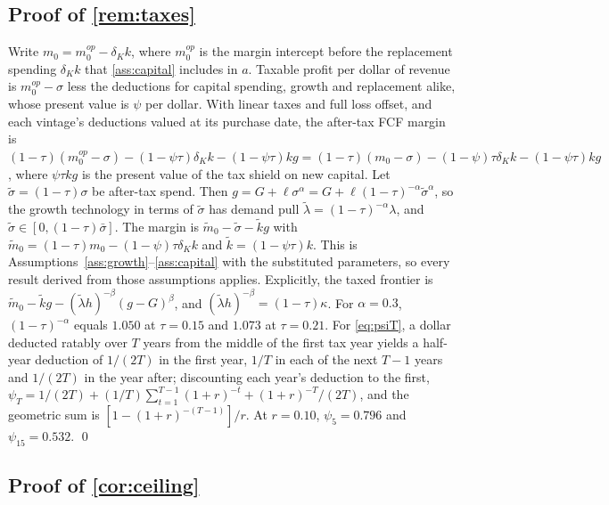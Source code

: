 \subsection*{Proof of \autoref{rem:taxes}}

Write $m_0=m_0^{op}-\delta_Kk$, where $m_0^{op}$ is the margin intercept before the replacement spending $\delta_Kk$ that \autoref{ass:capital} includes in $a$. Taxable profit per dollar of revenue is $m_0^{op}-\sigma$ less the deductions for capital spending, growth and replacement alike, whose present value is $\psi$ per dollar. With linear taxes and full loss offset, and each vintage's deductions valued at its purchase date, the after-tax FCF margin is $(1-\tau)(m_0^{op}-\sigma)-(1-\psi\tau)\delta_Kk-(1-\psi\tau)kg=(1-\tau)(m_0-\sigma)-(1-\psi)\tau\delta_Kk-(1-\psi\tau)kg$, where $\psi\tau kg$ is the present value of the tax shield on new capital. Let $\tilde\sigma=(1-\tau)\sigma$ be after-tax spend. Then $g=G+\ell\sigma^{\alpha}=G+\ell(1-\tau)^{-\alpha}\tilde\sigma^{\alpha}$, so the growth technology in terms of $\tilde\sigma$ has demand pull $\tilde\lambda=(1-\tau)^{-\alpha}\lambda$, and $\tilde\sigma\in[0,(1-\tau)\bar\sigma]$. The margin is $\tilde m_0-\tilde\sigma-\tilde kg$ with $\tilde m_0=(1-\tau)m_0-(1-\psi)\tau\delta_Kk$ and $\tilde k=(1-\psi\tau)k$. This is Assumptions~\ref{ass:growth}--\ref{ass:capital} with the substituted parameters, so every result derived from those assumptions applies. Explicitly, the taxed frontier is $\tilde m_0-\tilde kg-(\tilde\lambda h)^{-\beta}(g-G)^{\beta}$, and $(\tilde\lambda h)^{-\beta}=(1-\tau)\kappa$. For $\alpha=0.3$, $(1-\tau)^{-\alpha}$ equals $1.050$ at $\tau=0.15$ and $1.073$ at $\tau=0.21$. For \eqref{eq:psiT}, a dollar deducted ratably over $T$ years from the middle of the first tax year yields a half-year deduction of $1/(2T)$ in the first year, $1/T$ in each of the next $T-1$ years and $1/(2T)$ in the year after; discounting each year's deduction to the first, $\psi_T=1/(2T)+(1/T)\sum_{t=1}^{T-1}(1+r)^{-t}+(1+r)^{-T}/(2T)$, and the geometric sum is $[1-(1+r)^{-(T-1)}]/r$. At $r=0.10$, $\psi_5=0.796$ and $\psi_{15}=0.532$. \qed

\subsection*{Proof of \autoref{cor:ceiling}}

